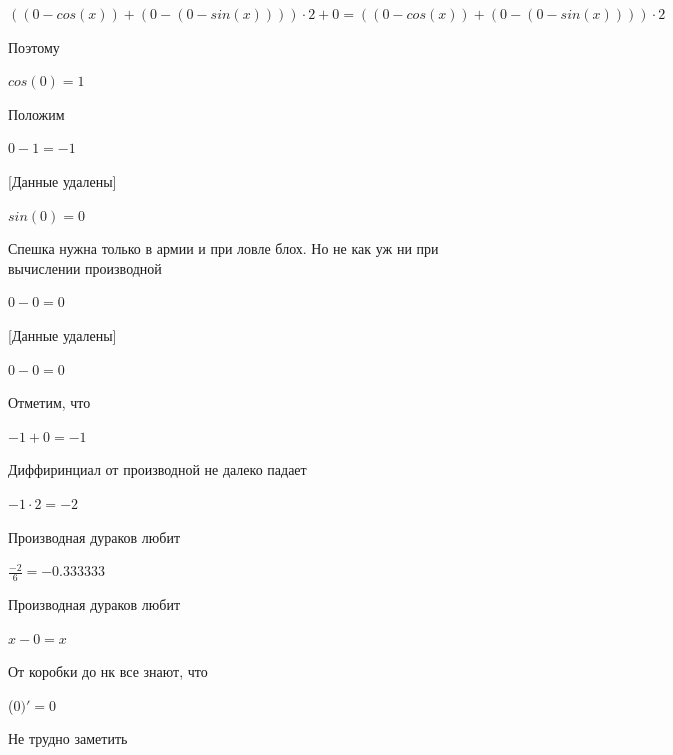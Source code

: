 \documentclass[12pt,a4paper,fleqn]{article}
\begin{document}
\begin{center}
\begin{center}
\begin{center}
\begin{center}
\begin{center}
\begin{center}
\begin{center}
\begin{center}
\begin{center}
\begin{center}
\begin{center}
\begin{center}
\begin{center}
\begin{center}
\begin{center}
\begin{center}
\begin{center}
\begin{center}
$((0-cos(x))+(0-(0-sin(x)))) \cdot 2+0 = ((0-cos(x))+(0-(0-sin(x)))) \cdot 2$\end{center}
Поэтому

\begin{center}
\begin{center}$cos(0) = 1$\end{center}
Положим

\begin{center}
\begin{center}$0-1 = -1$\end{center}
[Данные удалены]

\begin{center}
\begin{center}$sin(0) = 0$\end{center}
Спешка нужна только в армии и при ловле блох. Но не как уж ни при вычислении производной\cite{link2}

\begin{center}
\begin{center}$0-0 = 0$\end{center}
[Данные удалены]

\begin{center}
\begin{center}$0-0 = 0$\end{center}
Отметим, что

\begin{center}
\begin{center}$-1+0 = -1$\end{center}
Диффиринциал от производной не далеко падает\cite{link2}

\begin{center}
\begin{center}$-1 \cdot 2 = -2$\end{center}
Производная дураков любит\cite{link2}

\begin{center}
\begin{center}$\frac{-2}{6} = -0.333333$\end{center}
Производная дураков любит\cite{link2}

\begin{center}
$x-0 = x$\end{center}
От коробки до нк все знают, что

\begin{center}
 ($0)'
  = 0$\end{center}
Не трудно заметить


\end{center}
\end{center}
\end{center}
\end{center}
\end{center}
\end{center}
\end{center}
\end{center}
\end{center}
\end{center}
\end{center}
\end{center}
\end{center}
\end{center}
\end{center}
\end{center}
\end{center}
\end{center}
\end{center}
\end{center}
\end{center}
\end{center}
\end{center}
\end{center}
\end{center}
\end{document}

